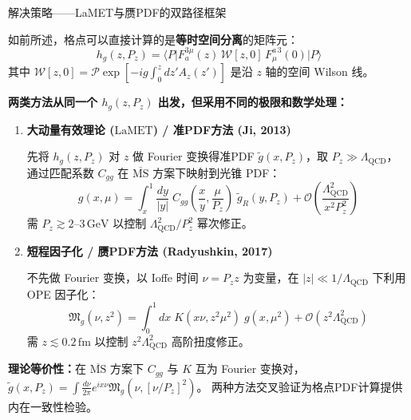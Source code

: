 \documentclass[10pt,aspectratio=169]{beamer}
\newcommand{\msbar}{\overline{\mathrm{MS}}}
\newcommand{\lqcd}{\Lambda_{\mathrm{QCD}}}
\newcommand{\LaMET}{\mathrm{LaMET}}
\newcommand{\GeV}{\,\mathrm{GeV}}
\newcommand{\fm}{\,\mathrm{fm}}
\begin{document}
\begin{frame}{解决策略——LaMET与赝PDF的双路径框架}

  如前所述，格点可以直接计算的是\textbf{等时空间分离}的矩阵元：
  \begin{equation*}
    h_g(z, P_z) = \big\langle P \big| F_a^{3\mu}(z)\, \mathcal{W}[z,0]\, F_{\mu}^{a\,3}(0) \big| P \big\rangle
  \end{equation*}
  其中 $\mathcal{W}[z,0] = \mathcal{P}\exp[-ig\int_0^z dz' A_z(z')]$ 是沿 $z$ 轴的空间 Wilson 线。

  \textbf{两类方法从同一个 $h_g(z, P_z)$ 出发，但采用不同的极限和数学处理：}

  \begin{enumerate}
    \item \textbf{大动量有效理论 ($\LaMET$) / 准PDF方法 (Ji, 2013)}

    先将 $h_g(z, P_z)$ 对 $z$ 做 Fourier 变换得准PDF $\tilde{g}(x, P_z)$，取 $P_z \gg \lqcd$，
    通过匹配系数 $C_{gg}$ 在 $\msbar$ 方案下映射到光锥 PDF：
    {\small
    \begin{equation*}
      g(x, \mu) = \int_x^1 \frac{dy}{|y|}\; C_{gg}\!\left(\frac{x}{y}, \frac{\mu}{P_z}\right)\;
      \tilde{g}_R(y, P_z) + \mathcal{O}\!\left(\frac{\lqcd^2}{x^2 P_z^2}\right)
    \end{equation*}}
    需 $P_z \gtrsim 2$--$3\GeV$ 以控制 $\lqcd^2/P_z^2$ 幂次修正。

    \item \textbf{短程因子化 / 赝PDF方法 (Radyushkin, 2017)}

    不先做 Fourier 变换，以 Ioffe 时间 $\nu = P_z z$ 为变量，在 $|z| \ll 1/\lqcd$ 下利用 OPE 因子化：
    \begin{equation*}
      \mathfrak{M}_g(\nu, z^2) = \int_0^1 dx\; K(x\nu, z^2\mu^2)\; g(x, \mu^2) + \mathcal{O}(z^2\lqcd^2)
    \end{equation*}
    需 $z \lesssim 0.2\fm$ 以控制 $z^2\lqcd^2$ 高阶扭度修正。
  \end{enumerate}

  \textbf{理论等价性：}在 $\msbar$ 方案下 $C_{gg}$ 与 $K$ 互为 Fourier 变换对，
  $\tilde{g}(x,P_z) = \int \frac{d\nu}{2\pi} e^{ix\nu} \mathfrak{M}_g(\nu, [\nu/P_z]^2)$。
  两种方法交叉验证为格点PDF计算提供内在一致性检验。\vspace{-14pt}
\end{frame}
\end{document}
